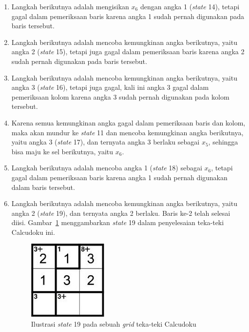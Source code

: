 \begin{enumerate}
\item Langkah berikutnya adalah mengisikan \begin{math}x_6\end{math} dengan angka 1 (\textit{state} 14), tetapi gagal dalam pemeriksaan baris karena angka 1 sudah pernah digunakan pada baris tersebut.
\item Langkah berikutnya adalah mencoba kemungkinan angka berikutnya, yaitu angka 2 (\textit{state} 15), tetapi juga gagal dalam pemeriksaan baris karena angka 2 sudah pernah digunakan pada baris tersebut.
\item Langkah berikutnya adalah mencoba kemungkinan angka berikutnya, yaitu angka 3 (\textit{state} 16), tetapi juga gagal, kali ini angka 3 gagal dalam pemeriksaan kolom karena angka 3 sudah pernah digunakan pada kolom tersebut.
\item Karena semua kemungkinan angka gagal dalam pemeriksaan baris dan kolom, maka akan mundur ke \textit{state} 11 dan mencoba kemungkinan angka berikutnya, yaitu angka 3 (\textit{state} 17), dan ternyata angka 3 berlaku sebagai \begin{math}x_5\end{math}, sehingga bisa maju ke sel berikutnya, yaitu \begin{math}x_6\end{math}.
\item Langkah berikutnya adalah mencoba angka 1 (\textit{state} 18) sebagai \begin{math}x_6\end{math}, tetapi gagal dalam pemeriksaan baris karena angka 1 sudah pernah digunakan dalam baris tersebut.
\item Langkah berikutnya adalah mencoba kemungkinan angka berikutnya, yaitu angka 2 (\textit{state} 19), dan ternyata angka 2 berlaku. Baris ke-2 telah selesai diisi. Gambar~\ref{fig:backtracking6} menggambarkan \textit{state} 19 dalam penyelesaian teka-teki Calcudoku ini.

\begin{figure}
\centering
\captionsetup{justification=centering}
\includegraphics[scale=0.75]{Gambar/Backtracking6}
\caption[Ilustrasi \textit{state} 19 pada sebuah \textit{grid} teka-teki Calcudoku ~\cite{fahda:16:backtracking}]{Ilustrasi \textit{state} 19 pada sebuah \textit{grid} teka-teki Calcudoku ~\cite{fahda:16:backtracking}}
\label{fig:backtracking6}
\end{figure}


\end{enumerate}
